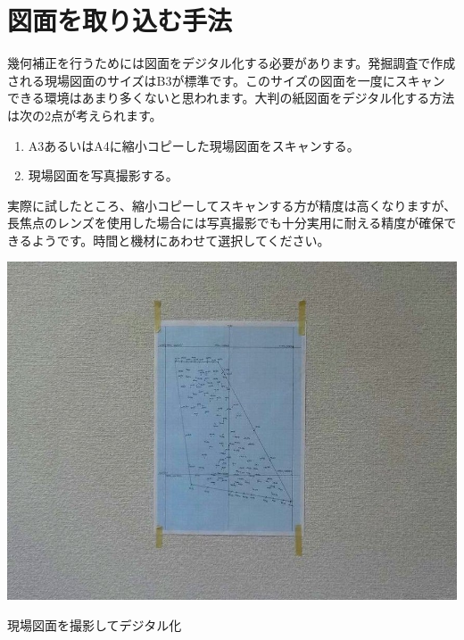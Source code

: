 \documentclass[14Q,twocolumn]{jsarticle}
\makeatletter
\newenvironment{figurehere}
  {\def\@captype{figure}}
  {}
\makeatother
\begin{document}
\section{図面を取り込む手法}
幾何補正を行うためには図面をデジタル化する必要があります。発掘調査で作成される現場図面のサイズはB3が標準です。このサイズの図面を一度にスキャンできる環境はあまり多くないと思われます。大判の紙図面をデジタル化する方法は次の2点が考えられます。

\begin{enumerate}
\item A3あるいはA4に縮小コピーした現場図面をスキャンする。
\item 現場図面を写真撮影する。
\end{enumerate}

実際に試したところ、縮小コピーしてスキャンする方が精度は高くなりますが、長焦点のレンズを使用した場合には写真撮影でも十分実用に耐える精度が確保できるようです。時間と機材にあわせて選択してください。

\begin{figurehere}
\centering
\includegraphics[width=1\linewidth]{19.jpg}
\caption{現場図面を撮影してデジタル化}
\end{figurehere}

\end{document}
